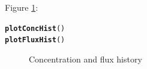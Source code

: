 \documentclass[a4paper,11pt]{article}\usepackage{graphicx, color}
\makeatletter
\newcommand{\hlfunctioncall}[1]{\textcolor[rgb]{0.501960784313725,0,0.329411764705882}{\textbf{#1}}}%
\newenvironment{kframe}{%
 \def\at@end@of@kframe{}%
 \ifinner\ifhmode%
  \def\at@end@of@kframe{\end{minipage}}%
  \begin{minipage}{\columnwidth}%
 \fi\fi%
 \def\FrameCommand##1{\hskip\@totalleftmargin \hskip-\fboxsep
 \colorbox{shadecolor}{##1}\hskip-\fboxsep
     \hskip-\linewidth \hskip-\@totalleftmargin \hskip\columnwidth}%
 \MakeFramed {\advance\hsize-\width
   \@totalleftmargin\z@ \linewidth\hsize
   \@setminipage}}%
 {\par\unskip\endMakeFramed%
 \at@end@of@kframe}
\newenvironment{knitrout}{}{} %
\makeatother
\begin{document}
Figure \ref{fig:plotFluxHist}:
\begin{knitrout}
\color{fgcolor}\begin{kframe}
\begin{alltt}
\hlfunctioncall{plotConcHist}()
\hlfunctioncall{plotFluxHist}()
\end{alltt}
\end{kframe}\begin{figure}[]
\caption[Concentration and flux history]{Concentration and flux history\label{fig:plotFluxHist}}
\end{figure}


\end{knitrout}
\end{document}
